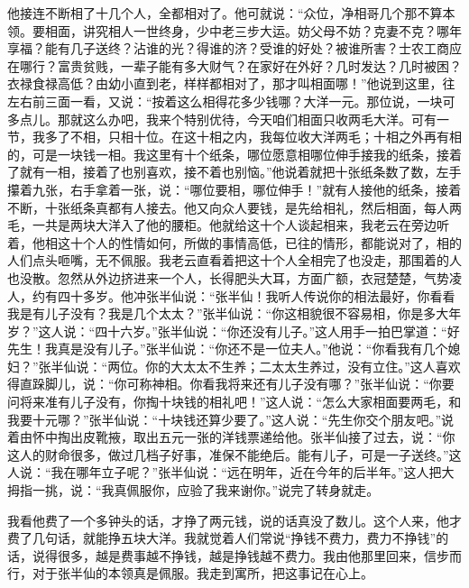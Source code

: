 \documentclass[12pt,UTF8]{ctexbook}
\begin{document}
他接连不断相了十几个人，全都相对了。他可就说：“众位，净相哥几个那不算本领。要相面，讲究相人一世终身，少中老三步大运。妨父母不妨？克妻不克？哪年享福？能有几子送终？沾谁的光？得谁的济？受谁的好处？被谁所害？士农工商应在哪行？富贵贫贱，一辈子能有多大财气？在家好在外好？几时发达？几时被困？衣禄食禄高低？由幼小直到老，样样都相对了，那才叫相面哪！”他说到这里，往左右前三面一看，又说：“按着这么相得花多少钱哪？大洋一元。那位说，一块可多点儿。那就这么办吧，我来个特别优待，今天咱们相面只收两毛大洋。可有一节，我多了不相，只相十位。在这十相之内，我每位收大洋两毛；十相之外再有相的，可是一块钱一相。我这里有十个纸条，哪位愿意相哪位伸手接我的纸条，接着了就有一相，接着了也别喜欢，接不着也别恼。”他说着就把十张纸条数了数，左手攥着九张，右手拿着一张，说：“哪位要相，哪位伸手！”就有人接他的纸条，接着不断，十张纸条真都有人接去。他又向众人要钱，是先给相礼，然后相面，每人两毛，一共是两块大洋入了他的腰柜。他就给这十个人谈起相来，我老云在旁边听着，他相这十个人的性情如何，所做的事情高低，已往的情形，都能说对了，相的人们点头咂嘴，无不佩服。我老云直看着把这十个人全相完了也没走，那围着的人也没散。忽然从外边挤进来一个人，长得肥头大耳，方面广额，衣冠楚楚，气势凌人，约有四十多岁。他冲张半仙说：“张半仙！我听人传说你的相法最好，你看看我是有儿子没有？我是几个太太？”张半仙说：“你这相貌很不容易相，你是多大年岁？”这人说：“四十六岁。”张半仙说：“你还没有儿子。”这人用手一拍巴掌道：“好先生！我真是没有儿子。”张半仙说：“你还不是一位夫人。”他说：“你看我有几个媳妇？”张半仙说：“两位。你的大太太不生养；二太太生养过，没有立住。”这人喜欢得直跺脚儿，说：“你可称神相。你看我将来还有儿子没有哪？”张半仙说：“你要问将来准有儿子没有，你掏十块钱的相礼吧！”这人说：“怎么大家相面要两毛，和我要十元哪？”张半仙说：“十块钱还算少要了。”这人说：“先生你交个朋友吧。”说着由怀中掏出皮靴掖，取出五元一张的洋钱票递给他。张半仙接了过去，说：“你这人的财命很多，做过几档子好事，准保不能绝后。能有儿子，可是一子送终。”这人说：“我在哪年立子呢？”张半仙说：“远在明年，近在今年的后半年。”这人把大拇指一挑，说：“我真佩服你，应验了我来谢你。”说完了转身就走。

我看他费了一个多钟头的话，才挣了两元钱，说的话真没了数儿。这个人来，他才费了几句话，就能挣五块大洋。我就觉着人们常说“挣钱不费力，费力不挣钱”的话，说得很多，越是费事越不挣钱，越是挣钱越不费力。我由他那里回来，信步而行，对于张半仙的本领真是佩服。我走到寓所，把这事记在心上。
\end{document}
